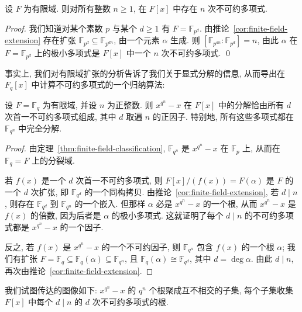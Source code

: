 \begin{corollary}\label{cor:irred-degree-n}
设 $F$ 为有限域. 则对所有整数 $n\geq 1$, 在 $F[x]$ 中存在 $n$ 次不可约多项式.
\end{corollary}

\begin{proof}
我们知道对某个素数 $p$ 与某个 $d\geq 1$ 有 $F=\mathbb{F}_{p^d}$. 由推论~\ref{cor:finite-field-extension} 存在扩张 $\mathbb{F}_{p^d}\subseteq\mathbb{F}_{p^{dn}}$, 由一个元素 $\alpha$ 生成. 则 $[\mathbb{F}_{p^{dn}}:\mathbb{F}_{p^d}]=n$, 由此 $\alpha$ 在 $F=\mathbb{F}_{p^d}$ 上的极小多项式是 $F[x]$ 中一个 $n$ 次不可约多项式. \qed
\end{proof}

事实上, 我们对有限域扩张的分析告诉了我们关于显式分解的信息, 从而导出在 $F_q[x]$ 中计算不可约多项式的一个归纳算法:

\begin{corollary}\label{cor:factor-xqn}
设 $F=\mathbb{F}_q$ 为有限域, 并设 $n$ 为正整数. 则 $x^{q^n}-x$ 在 $F[x]$ 中的分解恰由所有 $d$ 次首一不可约多项式组成, 其中 $d$ 取遍 $n$ 的正因子. 特别地, 所有这些多项式都在 $\mathbb{F}_{q^n}$ 中完全分解.
\end{corollary}

\begin{proof}
由定理~\ref{thm:finite-field-classification}, $\mathbb{F}_{q^n}$ 是 $x^{q^n}-x$ 在 $\mathbb{F}_p$ 上, 从而在 $\mathbb{F}_q=F$ 上的分裂域.

若 $f(x)$ 是一个 $d$ 次首一不可约多项式, 则 $F[x]/(f(x))=F(\alpha)$ 是 $F$ 的一个 $d$ 次扩张, 即 $\mathbb{F}_{q^d}$ 的一个同构拷贝. 由推论~\ref{cor:finite-field-extension}, 若 $d\mid n$, 则存在 $\mathbb{F}_{q^d}$ 到 $\mathbb{F}_{q^n}$ 的一个嵌入. 但那样 $\alpha$ 必是 $x^{q^n}-x$ 的一个根, 从而 $x^{q^n}-x$ 是 $f(x)$ 的倍数, 因为后者是 $\alpha$ 的极小多项式. 这就证明了每个 $d\mid n$ 的不可约多项式都是 $x^{q^n}-x$ 的一个因子.

反之, 若 $f(x)$ 是 $x^{q^n}-x$ 的一个不可约因子, 则 $\mathbb{F}_{q^n}$ 包含 $f(x)$ 的一个根 $\alpha$; 我们有扩张 $F=\mathbb{F}_q\subseteq\mathbb{F}_q(\alpha)\subseteq\mathbb{F}_{q^n}$, 且 $\mathbb{F}_q(\alpha)\cong\mathbb{F}_{q^d}$, 其中 $d=\deg\alpha$. 由此 $d\mid n$, 再次由推论~\ref{cor:finite-field-extension}.
\end{proof}

我们试图传达的图像如下: $x^{q^n}-x$ 的 $q^n$ 个根聚成互不相交的子集, 每个子集收集 $F[x]$ 中每个 $d\mid n$ 的 $d$ 次不可约多项式的根.

